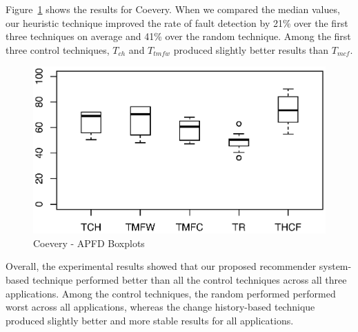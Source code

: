 Figure~\ref{fig:Coevery} shows the results for Coevery. 
When we compared the median values, our heuristic technique improved
the rate of fault detection by 21\% over the first three techniques 
on average and 41\% over the random technique. 
Among the first three control techniques, $T_{ch}$ and $T_{tmfw}$ 
produced slightly better results than $T_{mcf}$.

\begin{figure}[!ht]
	\centering
	\includegraphics[width=1.05\linewidth]{./Coevery3_adjusted.eps}
	\vspace*{-10pt}
	\caption{Coevery - APFD Boxplots}
	\label{fig:Coevery}
\end{figure}

Overall, the experimental results showed that our proposed recommender 
system-based technique performed better than all the control techniques 
across all three applications. 
Among the control techniques, the random performed performed worst across all applications,
whereas the change history-based technique produced slightly better and more stable   
results for all applications.


